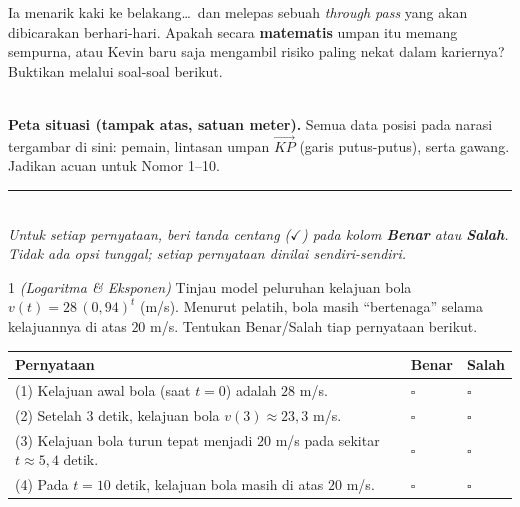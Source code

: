 \documentclass[11pt]{article}
\makeatletter
\newenvironment{bstabel}{%
  \par\smallskip\begin{center}\renewcommand{\arraystretch}{1.35}%
  \begin{tabular}{@{}p{0.72\textwidth}>{\centering\arraybackslash}m{1.5cm}>{\centering\arraybackslash}m{1.5cm}@{}}
  \toprule
  \textbf{Pernyataan} & \textbf{Benar} & \textbf{Salah}\\\midrule}%
  {\bottomrule\end{tabular}\end{center}}
\newcommand{\bs}[1]{#1 & $\square$ & $\square$\\[1pt]}
\makeatother
\begin{document}
\smallskip
Ia menarik kaki ke belakang\dots\ dan melepas sebuah \textit{through pass} yang
akan dibicarakan berhari-hari. Apakah secara \textbf{matematis} umpan itu memang
sempurna, atau Kevin baru saja mengambil risiko paling nekat dalam kariernya?
Buktikan melalui soal-soal berikut.

\begin{center}
\\[2pt]
{\small\textbf{Peta situasi (tampak atas, satuan meter).} Semua data posisi pada
narasi tergambar di sini: pemain, lintasan umpan $\vec{KP}$ (garis putus-putus),
serta gawang. Jadikan acuan untuk Nomor 1--10.}
\end{center}

\vspace{0.3cm}
\noindent\rule{\linewidth}{0.6pt}
\vspace{0.1cm}

\\[0.2em]
\small\emph{Untuk setiap pernyataan, beri tanda centang ($\checkmark$) pada
kolom \textbf{Benar} atau \textbf{Salah}. Tidak ada opsi tunggal; setiap
pernyataan dinilai sendiri-sendiri.}\normalsize

\bigskip

\begin{soal}{1 \normalfont\itshape(Logaritma \& Eksponen)}
Tinjau model peluruhan kelajuan bola $v(t)=28\,(0{,}94)^{t}$ (m/s). Menurut
pelatih, bola masih ``bertenaga'' selama kelajuannya di atas $20$ m/s. Tentukan
Benar/Salah tiap pernyataan berikut.
\begin{bstabel}
  \bs{(1) Kelajuan awal bola (saat $t=0$) adalah $28$ m/s.}
  \bs{(2) Setelah $3$ detik, kelajuan bola $v(3)\approx 23{,}3$ m/s.}
  \bs{(3) Kelajuan bola turun tepat menjadi $20$ m/s pada sekitar $t\approx 5{,}4$ detik.}
  \bs{(4) Pada $t=10$ detik, kelajuan bola masih di atas $20$ m/s.}
\end{bstabel}
\end{soal}
\end{document}
